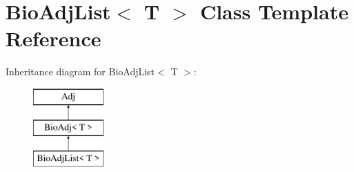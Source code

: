 \hypertarget{class_bio_adj_list}{}\section{Bio\+Adj\+List$<$ T $>$ Class Template Reference}
\label{class_bio_adj_list}
Inheritance diagram for Bio\+Adj\+List$<$ T $>$\+:\begin{figure}[H]
\begin{center}
\leavevmode
\includegraphics[height=3.000000cm]{class_bio_adj_list}
\end{center}
\end{figure}
